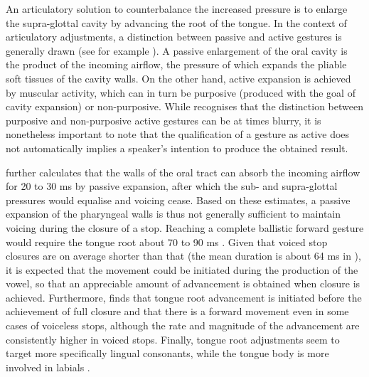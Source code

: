 \documentclass[12pt,]{article}
\begin{document}
An articulatory solution to counterbalance the increased pressure is to
enlarge the supra-glottal cavity by advancing the root of the tongue. In
the context of articulatory adjustments, a distinction between passive
and active gestures is generally drawn (see for example
\citealt{rothenberg1967}). A passive enlargement of the oral cavity is
the product of the incoming airflow, the pressure of which expands the
pliable soft tissues of the cavity walls. On the other hand, active
expansion is achieved by muscular activity, which can in turn be
purposive (produced with the goal of cavity expansion) or non-purposive.
While \citet{rothenberg1967} recognises that the distinction between
purposive and non-purposive active gestures can be at times blurry, it
is nonetheless important to note that the qualification of a gesture as
active does not automatically implies a speaker's intention to produce
the obtained result.

\citet{rothenberg1967} further calculates that the walls of the oral
tract can absorb the incoming airflow for 20 to 30 ms by passive
expansion, after which the sub- and supra-glottal pressures would
equalise and voicing cease. Based on these estimates, a passive
expansion of the pharyngeal walls is thus not generally sufficient to
maintain voicing during the closure of a stop. Reaching a complete
ballistic forward gesture would require the tongue root about 70 to 90
ms \citep{rothenberg1967}. Given that voiced stop closures are on
average shorter than that (the mean duration is about 64 ms in
\citealt{luce1985}), it is expected that the movement could be initiated
during the production of the vowel, so that an appreciable amount of
advancement is obtained when closure is achieved. Furthermore,
\citet{westbury1983} finds that tongue root advancement is initiated
before the achievement of full closure and that there is a forward
movement even in some cases of voiceless stops, although the rate and
magnitude of the advancement are consistently higher in voiced stops.
Finally, tongue root adjustments seem to target more specifically
lingual consonants, while the tongue body is more involved in labials
\citep{perkell1969, westbury1983}.
\end{document}
